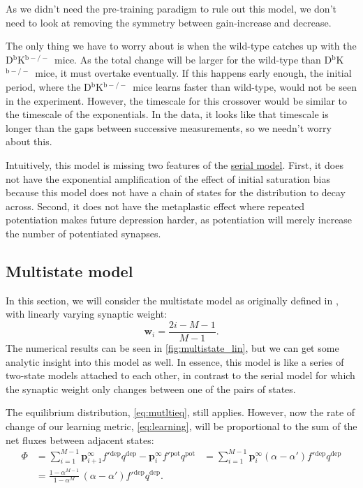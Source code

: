\documentclass[12pt]{article}
\newcommand{\pr}{\mathbf{p}}
\newcommand{\eq}{\pr^\infty}
\newcommand{\w}{\mathbf{w}}
\newcommand{\pot}{^{\text{pot}}}
\newcommand{\dep}{^{\text{dep}}}
\newcommand{\KO}{D$^\mathrm{b}$K$^{\mathrm{b}-/-}$}
\begin{document}
As we didn't need the pre-training paradigm to rule out this model, we don't need to look at removing the symmetry between gain-increase and decrease.

The only thing we have to worry about is when the wild-type catches up with the \KO\ mice.
As the total change will be larger for the wild-type than \KO\ mice, it must overtake eventually.
If this happens early enough, the initial period, where the \KO\ mice learns faster than wild-type, would not be seen in the experiment.
However, the timescale for this crossover would be similar to the timescale of the exponentials.
In the data, it looks like that timescale is longer than the gaps between successive measurements, so we needn't worry about this.

Intuitively, this model is missing two features of the \hyperref[sec:multistate]{serial model}.
First, it does not have the exponential amplification of the effect of initial saturation bias because this model does not have a chain of states for the distribution to decay across.
Second, it does not have the metaplastic effect where repeated potentiation makes future depression harder, as potentiation will merely increase the number of potentiated synapses.


\subsection{Multistate model}\label{sec:multistate_lin}



In this section, we will consider the multistate model as originally defined in \cite{amit1994learning}, \ie with linearly varying synaptic weight:
%
\begin{equation}\label{eq:multistateLinWeight}
  \w_i = \frac{2i-M-1}{M-1}.
\end{equation}
%
The numerical results can be seen in \autoref{fig:multistate_lin}, but we can get some analytic insight into this model as well.
In essence, this model is like a series of two-state models attached to each other, in contrast to the serial model for which the synaptic weight only changes between one of the pairs of states.


The equilibrium distribution, \eqref{eq:mutltieq}, still applies.
However, now the rate of change of our learning metric, \eqref{eq:learning}, will be proportional to the sum of the net fluxes between adjacent states:
%
\begin{equation}\label{eq:multiLinFlux}
  \begin{aligned}
    \Phi &= \sum_{i=1}^{M-1} \eq_{i+1} f'{}\dep q\dep - \eq_i f'{}\pot q\pot
         &= \sum_{i=1}^{M-1} \eq_i (\alpha-\alpha') f'{}\dep q\dep \\
         &= \frac{1-\alpha^{M-1}}{1-\alpha^M} \, (\alpha-\alpha') f'{}\dep q\dep.
  \end{aligned}
\end{equation}
%
\end{document}
